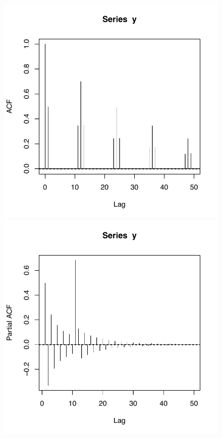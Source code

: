 \documentclass[10pt,a4paper]{article}
\begin{document}
\begin{enumerate}
\begin{figure}[H]
	\centering
	\includegraphics[scale=0.45]{acf_bw.pdf}
	\includegraphics[scale=0.45]{pacf_bw.pdf}
\end{figure}



\end{enumerate}
\end{document}
